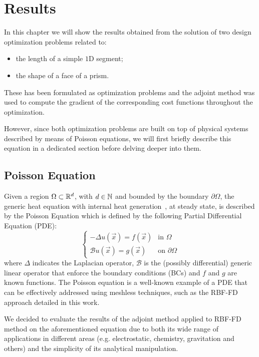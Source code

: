 \chapter{Results}
\label{chap:results}

In this chapter we will show the results obtained from the solution of two design optimization problems related to:
\begin{itemize}
	\item the length of a simple $1$D segment;
	\item the shape of a face of a prism.
\end{itemize}
These has been formulated as optimization problems and the adjoint method was used to compute the gradient of the corresponding cost functions throughout the optimization.

However, since both optimization problems are built on top of physical systems described by means of Poisson equations, we will first briefly describe this equation in a dedicated section before delving deeper into them.

\section{Poisson Equation}
\label{sec:poisson_equation}

Given a region $\Omega \subset \mathbb{R}^d$, with $d \in \mathbb{N}$ and bounded by the boundary $\partial\Omega$, the generic heat equation with internal heat generation~\cite{Brezis:functional_analysis_book}, at steady state, is described by the Poisson Equation which is defined by the following Partial Differential Equation (PDE):
\begin{equation}
	\label{eqn:Poisson_equation}
	\begin{cases}
		- \Delta u(\vec{x}) = f(\vec{x})														 &  \text{in $\Omega$}							\\
		\mathcal{B} u(\vec{x}) = g(\vec{x})  													 &  \text{on $\partial\Omega$}
	\end{cases}
\end{equation}
where $\Delta$ indicates the Laplacian operator, $\mathcal{B}$ is the (possibly differential) generic linear operator that enforce the boundary conditions (BCs) and $f$ and $g$ are known functions.
The Poisson equation is a well-known example of a PDE that can be effectively addressed using meshless techniques, such as the RBF-FD approach detailed in this work.

We decided to evaluate the results of the adjoint method applied to RBF-FD method on the aforementioned equation due to both its wide range of applications in different areas	(e.g. electrostatic, chemistry, gravitation and others) and the simplicity of its analytical manipulation.

